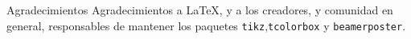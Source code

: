 \begin{block}{Agradecimientos}
    Agradecimientos a \LaTeX, y a los creadores, y comunidad en general, responsables de mantener los paquetes \texttt{tikz},\texttt{tcolorbox} y \texttt{beamerposter}.
\end{block}